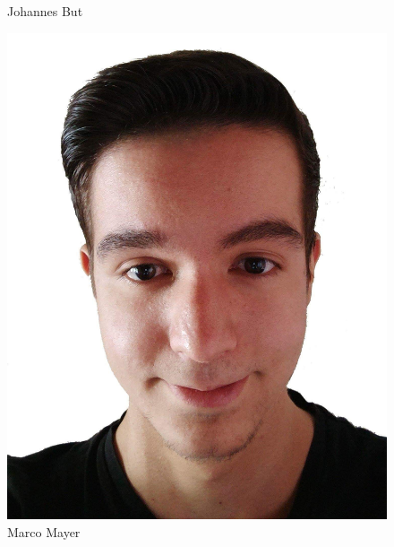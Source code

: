 \begin{figure}[htb]
\begin{minipage}{0.45\linewidth}
		\caption{Johannes But}
		\vspace{30pt}
	\end{minipage}
	\begin{minipage}{0.45\linewidth}
		\centering
		\includegraphics[scale=0.058]{content/pictures/Marco.png}
		\caption{Marco Mayer}
		\vspace{30pt}
	\end{minipage}
	\begin{minipage}{0.45\linewidth}
		\centering

\end{minipage}
\end{figure}
